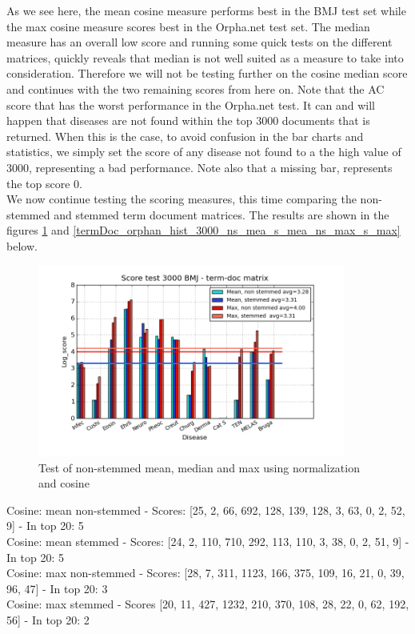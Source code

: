 As we see here, the mean cosine measure performs best in the BMJ test set while the max cosine measure scores best in the Orpha.net test set. The median measure has an overall low score and running some quick tests on the different matrices, quickly reveals that median is not well suited as a measure to take into consideration. Therefore we will not be testing further on the cosine median score and continues with the two remaining scores from here on. Note that the AC score that has the worst performance in the Orpha.net test. It can and will happen that diseases are not found within the top 3000 documents that is returned. When this is the case, to avoid confusion in the bar charts and statistics, we simply set the score of any disease not found to a the high value of 3000, representing a bad performance. Note also that a missing bar, represents the top score 0. \\

We now continue testing the scoring measures, this time comparing the non-stemmed and stemmed term document matrices. The results are shown in the figures \ref{termDoc_bmj_hist_3000_ns_mea_s_mea_ns_max_s_max} and \ref{termDoc_orphan_hist_3000_ns_mea_s_mea_ns_max_s_max} below.

\begin{figure}[h!]
        \begin{center}
          \includegraphics[width=0.9\textwidth]{barcharts/termDoc_bmj_hist_3000_ns_mea_s_mea_ns_max_s_max.png}
        \end{center}
        \caption{Test of non-stemmed mean, median and max using normalization and cosine}
        \label{termDoc_bmj_hist_3000_ns_mea_s_mea_ns_max_s_max}
\end{figure}

Cosine: mean non-stemmed - Scores: [25, 2, 66, 692, 128, 139, 128, 3, 63, 0, 2, 52, 9] - In top 20: 5 \\
Cosine: mean stemmed - Scores: [24, 2, 110, 710, 292, 113, 110, 3, 38, 0, 2, 51, 9] - In top 20: 5 \\
Cosine: max non-stemmed - Scores: [28, 7, 311, 1123, 166, 375, 109, 16, 21, 0, 39, 96, 47] - In top 20: 3 \\
Cosine: max stemmed - Scores [20, 11, 427, 1232, 210, 370, 108, 28, 22, 0, 62, 192, 56] - In top 20: 2 \\

